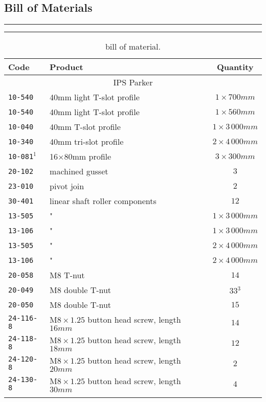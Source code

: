 
\begin{table}[p]
	\subsection{Bill of Materials}
	\rule{\linewidth}{2pt}
	\caption{bill of material.}
	\label{tab:BOM}
	\rule{\linewidth}{1pt} \vspace{0mm}	
	
	\begin{center}
	\begin{tabular}{l p{7.3cm} c}
	\textbf{Code} & \textbf{Product} & \textbf{Quantity} \\ \hline
	\multicolumn{3}{c}{IPS Parker} \\
		\texttt{10-540} & 40mm light T-slot profile & $1 \times 700mm$ \\
		\texttt{10-540} & 40mm light T-slot profile & $1 \times 560mm$ \\
		\texttt{10-040} & 40mm T-slot profile & $1\times 3\,000mm$ \\
		\texttt{10-340} & 40mm tri-slot profile & $2\times 4\,000mm$ \\
		\texttt{10-081$^1$} & 16$\times$80mm profile & $3\times 300mm$ \\
		\texttt{20-102} & machined gusset & $3$ \\
		\texttt{23-010} & pivot join & $2$ \\
		\texttt{30-401} & linear shaft roller components & $12$ \\
		\texttt{13-505} & " & $1\times 3\,000mm$ \\
		\texttt{13-106} & " & $1\times 3\,000mm$ \\
		\texttt{13-505} & " & $2\times 4\,000mm$ \\
		\texttt{13-106} & " & $2\times 4\,000mm$ \\
		\texttt{20-058} & M8 T-nut & $14$ \\
		\texttt{20-049} & M8 double T-nut  & $33$$^3$ \\
		\texttt{20-050} & M8 double T-nut  & $15$ \\
		\texttt{24-116-8} & M$8\times1.25$ button head screw, length $16mm$ & $14$ \\
		\texttt{24-118-8} & M$8\times1.25$ button head screw, length $18mm$ & $12$ \\
		\texttt{24-120-8} & M$8\times1.25$ button head screw, length $20mm$ & $2$ \\
		\texttt{24-130-8} & M$8\times1.25$ button head screw, length $30mm$ & $4$ \\
$$
\end{tabular}
\end{center}
\end{table}
